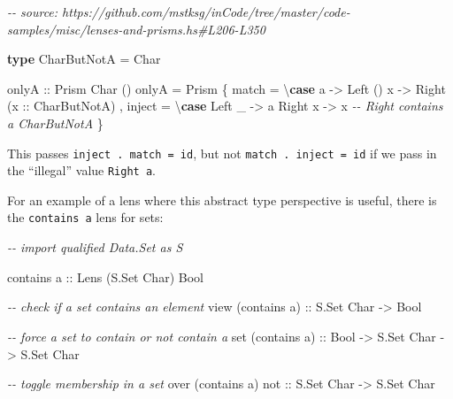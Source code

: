 \documentclass[]{article}
\newenvironment{Shaded}{}{}
\newcommand{\CharTok}[1]{\textcolor[rgb]{0.25,0.44,0.63}{#1}}
\newcommand{\CommentTok}[1]{\textcolor[rgb]{0.38,0.63,0.69}{\textit{#1}}}
\newcommand{\DataTypeTok}[1]{\textcolor[rgb]{0.56,0.13,0.00}{#1}}
\newcommand{\KeywordTok}[1]{\textcolor[rgb]{0.00,0.44,0.13}{\textbf{#1}}}
\newcommand{\NormalTok}[1]{#1}
\newcommand{\OtherTok}[1]{\textcolor[rgb]{0.00,0.44,0.13}{#1}}
\begin{document}
\begin{Shaded}
\begin{Highlighting}[]
\CommentTok{{-}{-} source: https://github.com/mstksg/inCode/tree/master/code{-}samples/misc/lenses{-}and{-}prisms.hs\#L206{-}L350}

\KeywordTok{type} \DataTypeTok{CharButNotA} \OtherTok{=} \DataTypeTok{Char}

\OtherTok{onlyA ::} \DataTypeTok{Prism\textquotesingle{}} \DataTypeTok{Char}\NormalTok{ ()}
\NormalTok{onlyA }\OtherTok{=} \DataTypeTok{Prism\textquotesingle{}}
\NormalTok{    \{ match  }\OtherTok{=}\NormalTok{ \textbackslash{}}\KeywordTok{case}
        \CharTok{\textquotesingle{}a\textquotesingle{}} \OtherTok{{-}>} \DataTypeTok{Left}\NormalTok{ ()}
\NormalTok{        x   }\OtherTok{{-}>} \DataTypeTok{Right}\NormalTok{ (}\OtherTok{x ::} \DataTypeTok{CharButNotA}\NormalTok{)}
\NormalTok{    , inject }\OtherTok{=}\NormalTok{ \textbackslash{}}\KeywordTok{case}
        \DataTypeTok{Left}\NormalTok{  \_ }\OtherTok{{-}>} \CharTok{\textquotesingle{}a\textquotesingle{}}
        \DataTypeTok{Right}\NormalTok{ x }\OtherTok{{-}>}\NormalTok{ x        }\CommentTok{{-}{-} Right contains a CharButNotA}
\NormalTok{    \}}
\end{Highlighting}
\end{Shaded}

This passes \texttt{inject\ .\ match\ =\ id}, but not
\texttt{match\ .\ inject\ =\ id} if we pass in the ``illegal'' value
\texttt{Right\ \textquotesingle{}a\textquotesingle{}}.

For an example of a lens where this abstract type perspective is useful, there
is the \texttt{contains\ \textquotesingle{}a\textquotesingle{}} lens for sets:

\begin{Shaded}
\begin{Highlighting}[]
\CommentTok{{-}{-} import qualified Data.Set as S}

\NormalTok{contains }\CharTok{\textquotesingle{}a\textquotesingle{}}\OtherTok{ ::} \DataTypeTok{Lens\textquotesingle{}}\NormalTok{ (}\DataTypeTok{S.Set} \DataTypeTok{Char}\NormalTok{) }\DataTypeTok{Bool}

\CommentTok{{-}{-} check if a set contains an element}
\NormalTok{view (contains }\CharTok{\textquotesingle{}a\textquotesingle{}}\NormalTok{)}\OtherTok{ ::} \DataTypeTok{S.Set} \DataTypeTok{Char} \OtherTok{{-}>} \DataTypeTok{Bool}

\CommentTok{{-}{-} force a set to contain or not contain \textquotesingle{}a\textquotesingle{}}
\NormalTok{set (contains }\CharTok{\textquotesingle{}a\textquotesingle{}}\NormalTok{)}\OtherTok{ ::} \DataTypeTok{Bool} \OtherTok{{-}>} \DataTypeTok{S.Set} \DataTypeTok{Char} \OtherTok{{-}>} \DataTypeTok{S.Set} \DataTypeTok{Char}

\CommentTok{{-}{-} toggle membership in a set}
\NormalTok{over (contains }\CharTok{\textquotesingle{}a\textquotesingle{}}\NormalTok{)}\OtherTok{ not ::} \DataTypeTok{S.Set} \DataTypeTok{Char} \OtherTok{{-}>} \DataTypeTok{S.Set} \DataTypeTok{Char}
\end{Highlighting}
\end{Shaded}
\end{document}
